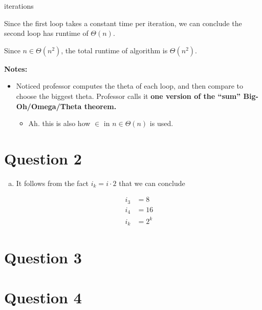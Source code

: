 \documentclass[12pt]{article}
\begin{document}
\begin{enumerate}[a.]
\begin{mdframed}
        iterations

        \bigskip

        \color{red}
        Since the first loop takes a constant time per iteration, we can conclude
        the second loop has runtime of $\Theta(n)$.
        \color{black}

        \bigskip

        \color{red}
        Since $n \in \Theta(n^2)$, the total runtime of algorithm is $\Theta(n^2)$.
        \color{black}

    \end{mdframed}

    \bigskip

    \textbf{Notes:}

    \begin{itemize}
        \item Noticed professor computes the theta of each loop, and then compare
        to choose the biggest theta. Professor calls it \textbf{one version of
        the “sum” Big-Oh/Omega/Theta theorem.}

        \begin{itemize}
            \item Ah. this is also how $\in$ in $n \in \Theta(n)$ is used.
        \end{itemize}

    \end{itemize}

\end{enumerate}

\section*{Question 2}
\begin{enumerate}[a.]
    \item

    It follows from the fact $i_k = i \cdot 2$ that we can conclude

    \begin{align*}
    i_3 &= 8\\
    i_4 &= 16\\
    i_k &= 2^k
    \end{align*}

\end{enumerate}

\section*{Question 3}

\section*{Question 4}
\end{document}
